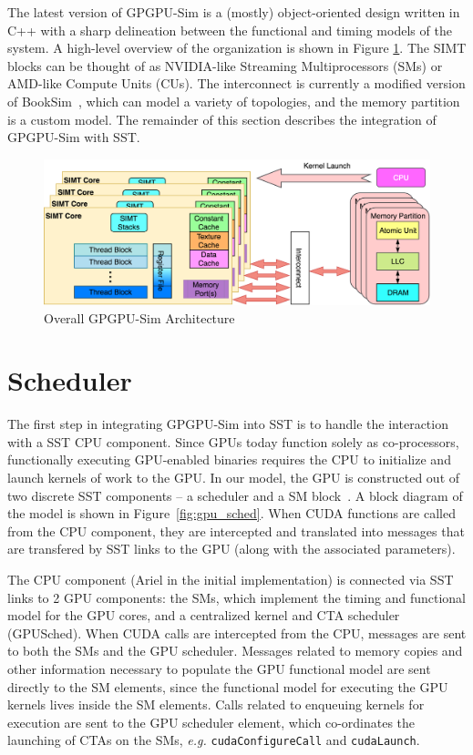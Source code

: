 The latest version of GPGPU-Sim is a (mostly) object-oriented design written in
C++ with a sharp delineation between the functional and timing models of the
system.
A high-level overview of the organization is shown in Figure
\ref{fig:gpgpusim_top}. The SIMT blocks can be thought of as NVIDIA-like Streaming
Multiprocessors (SMs) or AMD-like Compute Units (CUs). The interconnect is currently
a modified
version of BookSim~\cite{booksim}, which can model a variety of topologies, and
the memory partition is a custom model. The remainder of this section describes
the integration of GPGPU-Sim with SST.

   \begin{figure}[!htb]
      \centering
      \setlength{\abovecaptionskip}{6pt plus 1pt minus 1pt}
      \includegraphics[width=.85\textwidth,keepaspectratio]{figures/gpgpusim_top.png}
      \captionsetup{format=hang, justification=centering, width=.75\textwidth}
      \caption[Overall GPGPU-Sim Architecture]{Overall GPGPU-Sim Architecture \protect\cite{gpgpu_sim}}
      \label{fig:gpgpusim_top}
   \end{figure}

\section{Scheduler}
\label{sec:sched}
The first step in integrating GPGPU-Sim into SST is to handle the interaction
with a SST CPU component. Since GPUs today function solely as co-processors,
functionally executing GPU-enabled binaries requires the CPU to initialize and
launch kernels of work to the GPU. In our model, the GPU is constructed out of
two discrete SST components -- a scheduler and a SM block~\cite{v100}. A block
diagram of the model is shown in Figure~\ref{fig:gpu_sched}. When CUDA functions
are called from the CPU component, they are intercepted and translated into
messages that are transfered by SST links to the GPU (along with the associated
parameters).

The CPU component (Ariel in the initial implementation) is connected via SST
links to 2 GPU components: the SMs, which implement the timing and functional
model for the GPU cores, and a centralized kernel and CTA scheduler (GPUSched).
When CUDA calls are intercepted from the CPU, messages are sent to both the SMs
and the GPU scheduler. Messages related to memory copies and other information
necessary to populate the GPU functional model are sent directly to the SM
elements, since the functional model for executing the GPU kernels lives inside
the SM elements. Calls related to enqueuing kernels for execution are sent to
the GPU scheduler element, which co-ordinates the launching of CTAs on the SMs,
{\em e.g.} \texttt{cudaConfigureCall} and \texttt{cudaLaunch}.


